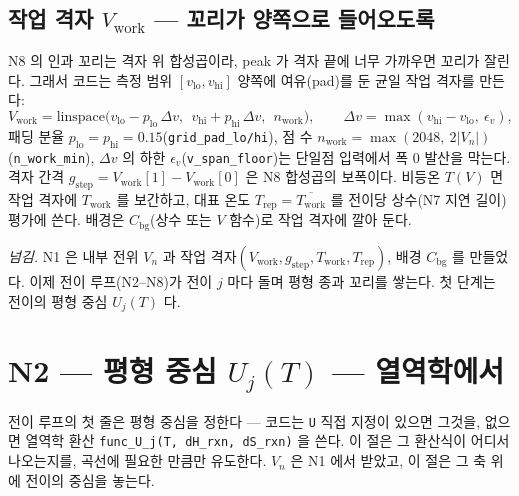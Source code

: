 \documentclass[11pt,a4paper]{article}
\newcommand{\bg}{\mathrm{bg}}
\newcommand{\work}{\mathrm{work}}
\newcommand{\rep}{\mathrm{rep}}
\newcommand{\code}[1]{\texttt{#1}}
\begin{document}
\subsection{작업 격자 $V_\work$ — 꼬리가 양쪽으로 들어오도록}
N8 의 인과 꼬리는 격자 위 합성곱이라, peak 가 격자 끝에 너무 가까우면 꼬리가 잘린다. 그래서 코드는 측정 범위 $[v_\mathrm{lo},v_\mathrm{hi}]$ 양쪽에 여유(pad)를 둔 균일 작업 격자를 만든다:
\begin{equation}
V_\work=\mathrm{linspace}\big(v_\mathrm{lo}-p_\mathrm{lo}\,\Delta v,\ \ v_\mathrm{hi}+p_\mathrm{hi}\,\Delta v,\ \ n_\work\big),\qquad
\Delta v=\max(v_\mathrm{hi}-v_\mathrm{lo},\ \epsilon_v),
\label{eq:vwork}
\end{equation}
패딩 분율 $p_\mathrm{lo}=p_\mathrm{hi}=0.15$(\code{grid\_pad\_lo/hi}), 점 수 $n_\work=\max(2048,\ 2|V_n|)$(\code{n\_work\_min}), $\Delta v$ 의 하한 $\epsilon_v$(\code{v\_span\_floor})는 단일점 입력에서 폭 $0$ 발산을 막는다. 격자 간격 $g_\mathrm{step}=V_\work[1]-V_\work[0]$ 은 N8 합성곱의 보폭이다. 비등온 $T(V)$ 면 작업 격자에 $T_\work$ 를 보간하고, 대표 온도 $T_\rep=\overline{T_\work}$ 를 전이당 상수(N7 지연 길이) 평가에 쓴다. 배경은 $C_\bg$(상수 또는 $V$ 함수)로 작업 격자에 깔아 둔다.

\medskip
\emph{넘김.} N1 은 내부 전위 $V_n$ 과 작업 격자$(V_\work,g_\mathrm{step},T_\work,T_\rep)$, 배경 $C_\bg$ 를 만들었다. 이제 전이 루프(N2--N8)가 전이 $j$ 마다 돌며 평형 종과 꼬리를 쌓는다. 첫 단계는 전이의 평형 중심 $U_j(T)$ 다.

\section{N2 — 평형 중심 $U_j(T)$ — 열역학에서}\label{sec:center}
전이 루프의 첫 줄은 평형 중심을 정한다 — 코드는 \code{U} 직접 지정이 있으면 그것을, 없으면 열역학 환산 \code{func\_U\_j(T, dH\_rxn, dS\_rxn)} 을 쓴다. 이 절은 그 환산식이 어디서 나오는지를, 곡선에 필요한 만큼만 유도한다. $V_n$ 은 N1 에서 받았고, 이 절은 그 축 위에 전이의 중심을 놓는다.
\end{document}
